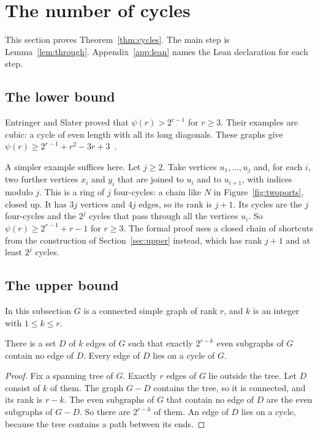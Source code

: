 \section{The number of cycles}\label{sec:cycles}

This section proves Theorem~\ref{thm:cycles}. The main step is Lemma~\ref{lem:through}.
Appendix~\ref{app:lean} names the Lean declaration for each step.

\subsection{The lower bound}

Entringer and Slater proved that $\psi(r)>2^{r-1}$ for $r\ge3$. Their examples are cubic: a cycle of
even length with all its long diagonals. These graphs give
$\psi(r)\ge2^{r-1}+r^{2}-3r+3$~\cite[Corollary~4]{ES}.

A simpler example suffices here. Let $j\ge2$. Take vertices $u_1,\dots,u_j$ and, for each $i$, two
further vertices $x_i$ and $y_i$ that are joined to $u_i$ and to $u_{i+1}$, with indices modulo $j$.
This is a ring of $j$ four-cycles: a chain like $N$ in Figure~\ref{fig:twoports}, closed up. It has
$3j$ vertices and $4j$ edges, so its rank is $j+1$. Its cycles are the $j$ four-cycles and the
$2^{j}$ cycles that pass through all the vertices $u_i$. So $\psi(r)\ge2^{r-1}+r-1$ for $r\ge3$.
The formal proof uses a closed chain of shortcuts from the construction of
Section~\ref{sec:upper} instead, which has rank $j+1$ and at least $2^{j}$ cycles.

\subsection{The upper bound}

In this subsection $G$ is a connected simple graph of rank $r$, and $k$ is an integer with
$1\le k\le r$.

\begin{lemma}\label{lem:indep}
There is a set $D$ of $k$ edges of $G$ such that exactly $2^{r-k}$ even subgraphs of $G$ contain no
edge of $D$. Every edge of $D$ lies on a cycle of $G$.
\end{lemma}

\begin{proof}
Fix a spanning tree of $G$. Exactly $r$ edges of $G$ lie outside the tree. Let $D$ consist of $k$
of them. The graph $G-D$ contains the tree, so it is connected, and its rank is $r-k$. The even
subgraphs of $G$ that contain no edge of $D$ are the even subgraphs of $G-D$. So there are
$2^{r-k}$ of them. An edge of $D$ lies on a cycle, because the tree contains a path between its
ends.
\end{proof}

